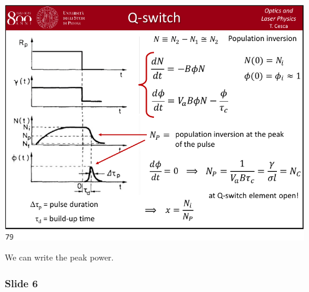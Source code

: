 \documentclass[../main/main.tex]{subfiles}
\begin{document}
\begin{minipage}[]{0.5\linewidth}
\centering
\includegraphics[page=5,width=1\textwidth]{../lessons/pdf_file/15_lecture.pdf}
\end{minipage}
\hspace{0.3cm}\vspace{0.3cm}
\begin{minipage}[c]{0.47\linewidth}

We can write the peak power.

\end{minipage}

\subsubsection*{Slide 6}
\end{document}
